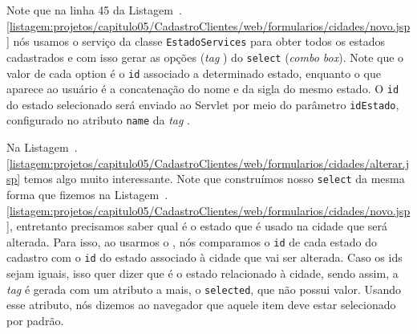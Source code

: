  


Note que na linha 45 da Listagem~\thechapter.\ref{listagem:projetos/capitulo05/CadastroClientes/web/formularios/cidades/novo.jsp} nós usamos o serviço  da classe \texttt{EstadoServices} para obter todos os estados cadastrados e com isso gerar as opções (\textit{tag} ) do \texttt{select} (\textit{combo box}). Note que o valor de cada option é o \texttt{id} associado a determinado estado, enquanto o que aparece ao usuário é a concatenação do nome e da sigla do mesmo estado. O \texttt{id} do estado selecionado será enviado ao Servlet por meio do parâmetro \texttt{idEstado}, configurado no atributo \texttt{name} da \textit{tag} .



Na Listagem~\thechapter.\ref{listagem:projetos/capitulo05/CadastroClientes/web/formularios/cidades/alterar.jsp} temos algo muito interessante. Note que construímos nosso \texttt{select} da mesma forma que fizemos na Listagem~\thechapter.\ref{listagem:projetos/capitulo05/CadastroClientes/web/formularios/cidades/novo.jsp}, entretanto precisamos saber qual é o estado que é usado na cidade que será alterada. Para isso, ao usarmos o , nós comparamos o \texttt{id} de cada estado do cadastro com o \texttt{id} do estado associado à cidade que vai ser alterada. Caso os ids sejam iguais, isso quer dizer que é o estado relacionado à cidade, sendo assim, a \textit{tag}  é gerada com um atributo a mais, o \texttt{selected}, que não possui valor. Usando esse atributo, nós dizemos ao navegador que aquele item deve estar selecionado por padrão.

